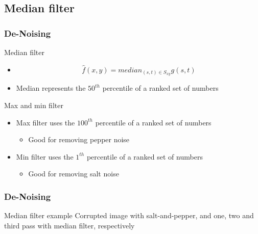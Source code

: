 \documentclass{beamer}
\begin{document}
\subsection{Median filter}
\begin{frame}
\frametitle{De-Noising}
\begin{block}{Median filter}
\begin{itemize}
	\item[] $$\hat{f}(x,y) = median_{(s,t)\in S_{xy}}{g(s,t)}$$
	\item Median represents the $50^{th}$ percentile of a ranked set of numbers
\end{itemize}
\end{block}
\begin{block}{Max and min filter}
\begin{itemize}
	\item Max filter uses the $100^{th}$ percentile of a ranked set of numbers
	\begin{itemize}
		\item Good for removing pepper noise 
	\end{itemize}
		\item Min filter uses the $1^{th}$ percentile of a ranked set of numbers
	\begin{itemize}
		\item Good for removing salt noise 
	\end{itemize}
\end{itemize}
\end{block}
\end{frame}
\begin{frame}
\frametitle{De-Noising}
\begin{block}{Median filter example}
\scriptsize{Corrupted image with salt-and-pepper, and one, two and third pass with median filter, respectively}\\
\end{block}
\end{frame}
\end{document}
